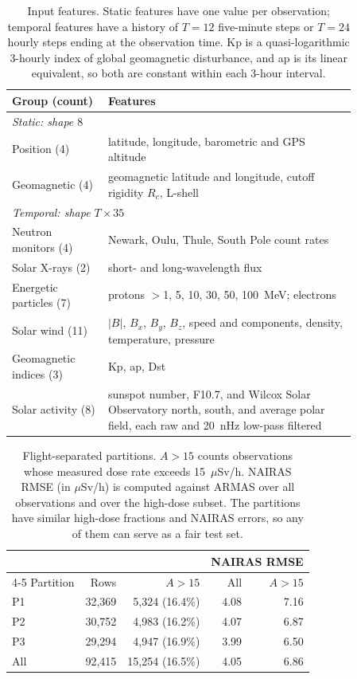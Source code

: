 \documentclass[10pt,twocolumn,letterpaper]{article}
\begin{document}
\begin{table}[h]
\caption{Input features. Static features have one value per observation;
temporal features have a history of $T=12$ five-minute steps or $T=24$ hourly
steps ending at the observation time. Kp is a quasi-logarithmic 3-hourly
index of global geomagnetic disturbance, and ap is its linear equivalent, so
both are constant within each 3-hour interval.}
\label{tab:features}\vspace{3pt}
\centering\small
\begin{tabular}{p{0.24\linewidth}p{0.62\linewidth}}\toprule
Group (count) & Features \\ \midrule
\multicolumn{2}{l}{\emph{Static: shape $8$}} \\
Position (4) & latitude, longitude, barometric and GPS altitude \\
Geomagnetic (4) & geomagnetic latitude and longitude, cutoff rigidity $R_c$, L-shell \\ \midrule
\multicolumn{2}{l}{\emph{Temporal: shape $T\times35$}} \\
Neutron monitors (4) & Newark, Oulu, Thule, South Pole count rates \\
Solar X-rays (2) & short- and long-wavelength flux \\
Energetic particles (7) & protons $>$1, 5, 10, 30, 50, 100~MeV; electrons \\
Solar wind (11) & $|B|$, $B_x$, $B_y$, $B_z$, speed and components, density, temperature, pressure \\
Geomagnetic indices (3) & Kp, ap, Dst \\
Solar activity (8) & sunspot number, F10.7, and Wilcox Solar Observatory north, south, and average polar field, each raw and 20~nHz low-pass filtered \\ \bottomrule
\end{tabular}
\end{table}

\begin{table}[h]
\caption{Flight-separated partitions. $A>15$ counts observations whose
measured dose rate exceeds 15~$\mu$Sv/h. NAIRAS RMSE (in $\mu$Sv/h) is
computed against ARMAS over all observations and over the high-dose subset.
The partitions have similar high-dose fractions and NAIRAS errors, so any of
them can serve as a fair test set.}
\label{tab:partitions}\vspace{3pt}
\centering\small
\begin{tabular}{lrrrr}\toprule
 & & & \multicolumn{2}{c}{NAIRAS RMSE} \\ \cmidrule(l){4-5}
Partition & Rows & $A>15$ & All & $A>15$ \\ \midrule
P1 & 32,369 & 5,324 (16.4\%) & 4.08 & 7.16 \\
P2 & 30,752 & 4,983 (16.2\%) & 4.07 & 6.87 \\
P3 & 29,294 & 4,947 (16.9\%) & 3.99 & 6.50 \\ \midrule
All & 92,415 & 15,254 (16.5\%) & 4.05 & 6.86 \\ \bottomrule
\end{tabular}
\end{table}
\end{document}
